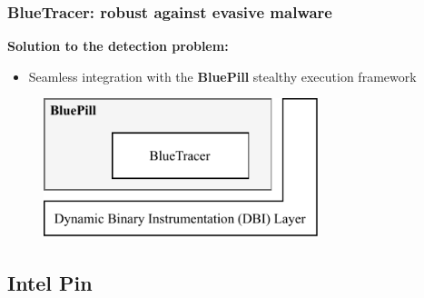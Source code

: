 \documentclass[compress]{beamer}
\begin{document}
\begin{frame}
    \frametitle{BlueTracer: robust against evasive malware}

\textcolor{sapienza}{\textbf{Solution to the detection problem:}}
\begin{itemize}
\item Seamless integration with the \textbf{BluePill} stealthy execution framework
\end{itemize}



\bigskip
\bigskip
	    \begin{figure}
    	\vspace{-0.8cm}
        \includegraphics[width=8cm]{image/BluePill.pdf}
    \end{figure}


\end{frame}

\iffalse
\subsection{Intel Pin}
\end{document}

